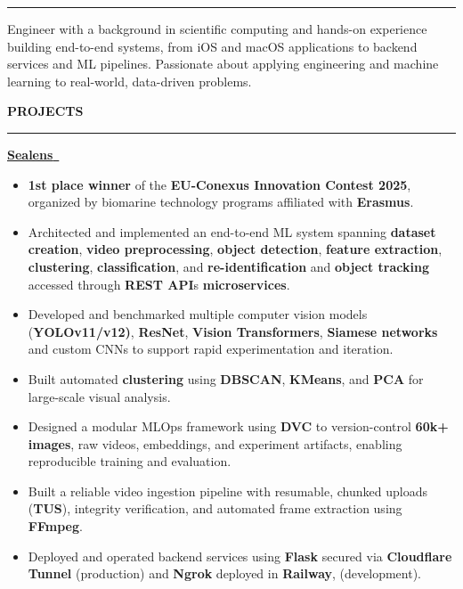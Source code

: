 \documentclass[11pt,letterpaper]{article}
\newenvironment{rSection}[1]{%
  \sectionskip
  \MakeUppercase{\bf#1}
  \sectionlineskip
  \hrule
  \begin{list}{}{\setlength{\leftmargin}{1.5em}}
  \item[]
}{%
  \end{list}
}
\def\sectionlineskip{\medskip}
\def\sectionskip{\medskip}
\begin{document}
\begin{rSection}{}

Engineer with a background in scientific computing and hands-on experience building end-to-end systems, from iOS and macOS applications to backend services and ML pipelines. Passionate about applying engineering and machine learning to real-world, data-driven problems.

\end{rSection}

\begin{rSection}{Projects}



\href{https://testflight.apple.com/join/Gq3z5Pus}{\textbf{Sealens}~\faLink}

\begin{itemize}
\itemsep -0.45em
\item \textbf{1st place winner} of the \textbf{EU-Conexus Innovation Contest 2025}, organized by biomarine technology programs affiliated with \textbf{Erasmus}.
\item Architected and implemented an end-to-end ML system spanning \textbf{dataset creation}, \textbf{video preprocessing}, \textbf{object detection}, \textbf{feature extraction}, \textbf{clustering}, \textbf{classification}, and \textbf{re-identification} and \textbf{object tracking} accessed through \textbf{REST API}s \textbf{microservices}.
\item Developed and benchmarked multiple computer vision models (\textbf{YOLOv11/v12)}, \textbf{ResNet}, \textbf{Vision Transformers}, \textbf{Siamese networks} and custom CNNs to support rapid experimentation and iteration.
\item Built automated \textbf{clustering} using \textbf{DBSCAN}, \textbf{KMeans}, and \textbf{PCA} for large-scale visual analysis.
\item Designed a modular MLOps framework using \textbf{DVC} to version-control \textbf{60k+ images}, raw videos, embeddings, and experiment artifacts, enabling reproducible training and evaluation.
\item Built a reliable video ingestion pipeline with resumable, chunked uploads (\textbf{TUS}), integrity verification, and automated frame extraction using \textbf{FFmpeg}.
\item Deployed and operated backend services using \textbf{Flask} secured via \textbf{Cloudflare Tunnel} (production) and \textbf{Ngrok} deployed in \textbf{Railway},  (development).
\end{itemize}



\end{rSection}
\end{document}
